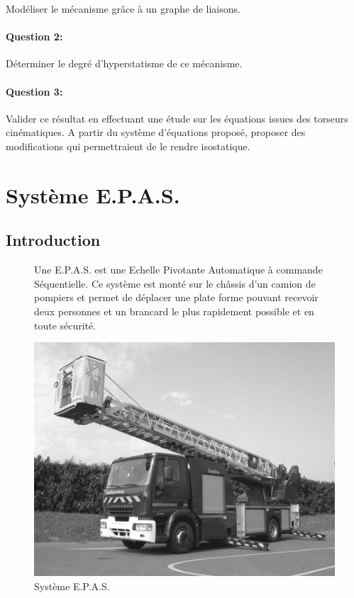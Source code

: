 Modéliser le mécanisme grâce à un graphe de liaisons.

\paragraph{Question 2:}

Déterminer le degré d'hyperstatisme de ce mécanisme.

\paragraph{Question 3:}

Valider ce résultat en effectuant une étude sur les équations issues des torseurs cinématiques. A partir du système d'équations proposé, proposer des modifications qui permettraient de le rendre isostatique.

\newpage

\section{Système E.P.A.S.}

\subsection{Introduction}

\begin{figure}[htbp]
\begin{minipage}[c]{.55\linewidth}
Une E.P.A.S. est une Echelle Pivotante Automatique à commande Séquentielle. Ce système est monté sur le châssis d'un camion de pompiers et permet de déplacer une plate forme pouvant recevoir deux personnes et un brancard le plus rapidement possible et en toute sécurité.
\end{minipage}
\hfill
\begin{minipage}[c]{.40\linewidth}
\begin{center}
\includegraphics[width=0.8\linewidth]{img/photo_camion.jpg}
\caption{Système E.P.A.S.}
\label{fig:image1}
\end{center}
\end{minipage}
\end{figure}

